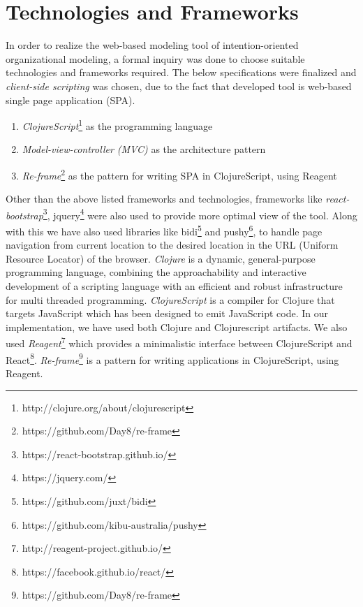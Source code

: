 \section{Technologies and Frameworks}
\label{subsec:specifications}
In order to realize the web-based modeling tool of intention-oriented organizational modeling, a formal inquiry was done to choose suitable technologies and frameworks required. The below specifications were finalized and \textit{client-side scripting} \cite{Sierra2012} was chosen, due to the fact that developed tool is web-based single page application (SPA). 

\begin{enumerate}   
	\item \textit{ClojureScript}\footnote{http://clojure.org/about/clojurescript} as the programming language
	\item \textit{Model-view-controller (MVC)} \cite{Deacon2009}  as the architecture pattern
	\item \textit{Re-frame}\footnote{https://github.com/Day8/re-frame} as the pattern for writing SPA \cite{Mikowski2013} in ClojureScript, using Reagent	
\end{enumerate}

Other than the above listed frameworks and technologies, frameworks like \textit{react-bootstrap}\footnote{https://react-bootstrap.github.io/}, jquery\footnote{https://jquery.com/} were also used to provide more optimal view of the tool. Along with this we have also used libraries like bidi\footnote{https://github.com/juxt/bidi} and pushy\footnote{https://github.com/kibu-australia/pushy}, to handle page navigation from current location to the desired location in the URL (Uniform Resource Locator) of the browser. \textit{Clojure} is a dynamic, general-purpose programming language, combining the approachability and interactive development of a scripting language with an efficient and robust infrastructure for multi threaded programming. \textit{ClojureScript} is a compiler for Clojure that targets JavaScript which has been designed to emit JavaScript code. In our implementation, we have used both Clojure and Clojurescript artifacts. We also used \textit{Reagent}\footnote{http://reagent-project.github.io/} which provides a minimalistic interface between ClojureScript and React\footnote{https://facebook.github.io/react/}. \textit{Re-frame}\footnote{https://github.com/Day8/re-frame} is a pattern for writing applications in ClojureScript, using Reagent.


